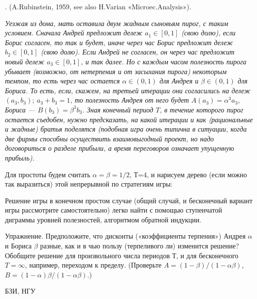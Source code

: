 \begin{problem}
.\newline
(A.Rubinstein, 1959, see also H.Varian
«Microec.Analysis»).\newline
 {\em
Уезжая из дома, мать оставила двум жадным сыновьям пирог, с
таким условием. Сначала Андрей предложит дележ $a_1\in
[0,1]$ (свою долю), если Борис согласен, то так и будет,
иначе через час Борис предложит дележ $b_2\in [0,1]$ (свою
долю). Если Андрей не согласен, он через час предложит
новый дележ $a_3\in [0,1]$, и так далее. Но с каждым часом
полезность пирога убывает (возможно, от нетерпения и от
засыхания пирога) некоторым темпом, то есть через час
остается $\alpha\in (0,1)$ для Андрея и $\beta\in (0,1)$
для Бориса. То есть, если, скажем, на третьей итерации они
согласились на дележ $(a_3, b_3); ~ a_3+ b_3=1$, то
полезность Андрея от него будет $A(a_3)=\alpha^3 a_3$,
Бориса
--- $B(b_3)=\beta^3 b_3$. Зная конечный период $T$, в течение
которого пирог остается съедобен, нужно предсказать, на
какой итерации и как (рациональные и жадные) братья
поделятся (подобная игра очень типична в ситуации, когда
две фирмы способны осуществить взаимовыгодный проект, но
надо договориться о разделе прибыли, а время переговоров
означает упущенную прибыль).

Для простоты будем считать $\alpha = \beta =1/2$, Т=4, и
нарисуем дерево (если можно так выразиться) этой
непрерывной по стратегиям игры:

Решение игры в конечном простом случае (общий случай, и
бесконечный вариант игры рассмотрите самостоятельно) легко
найти с помощью ступенчатой диграммы уровней полезностей,
алгоритмом обратной индукции.

Упражнение. Предположите, что дисконты («коэффициенты
терпения») Андрея $\alpha$ и Бориса $\beta$ разные, как и в
чью пользу (терпеливого ли) изменится решение? Обобщите
решение для произвольного числа периодов Т, и для
бесконечного $T=\infty$, например, переходом к пределу.
(Проверьте $A=(1-\beta)/(1-\alpha\beta)$,
$B=(1-\alpha)\beta/(1-\alpha\beta)$.)}



\begin{sol}

\end{sol}
\end{problem}


\begin{source}
БЗИ, НГУ
\end{source}




